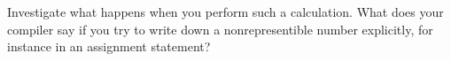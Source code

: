   Investigate what happens when you perform such a calculation. What
  does your compiler say if you try to write down a nonrepresentible
  number explicitly, for instance in an assignment statement?

